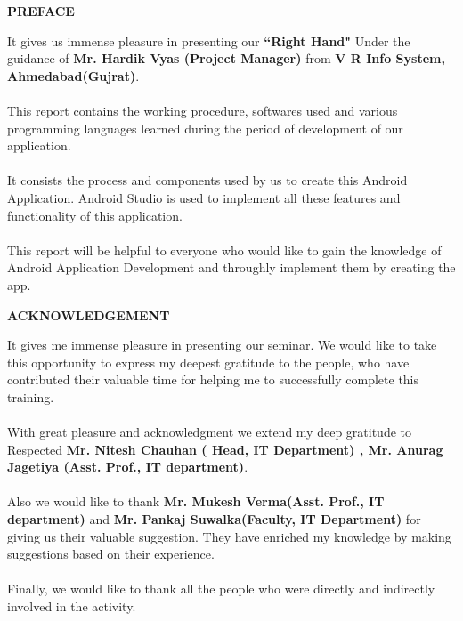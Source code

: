 \documentclass[twoside,a4paper,16pt]{book}
\begin{document}
\newpage
\begin{center}
\huge{\bf PREFACE}
\end{center}
\vspace{1.5cm}
\large It gives us immense pleasure in presenting our {\bf ``Right Hand"}  Under the  guidance of  {\bf Mr. Hardik Vyas (Project Manager)} from {\bf V R Info System, Ahmedabad(Gujrat)}.\\\\
This report contains the working procedure, softwares used and various programming languages learned during the period of development of our application.\\\\
It consists the process and components used by us to create this Android Application. Android Studio is used to implement all these features and functionality of this application.\\\\
This report will be helpful to everyone who would like to gain the knowledge of Android Application Development and throughly implement them by creating the app. 
 \newpage
\begin{center}
\huge{\bf ACKNOWLEDGEMENT} 
\end{center}
\vspace{1.5cm}
It gives me immense pleasure in presenting our seminar. We would like to take this
opportunity to express my deepest gratitude to the people, who have contributed
their valuable time for helping me to successfully complete this training.\\\\
 With great pleasure and acknowledgment we extend my deep gratitude to Respected
 {\bf Mr. Nitesh Chauhan ( Head, IT Department) , Mr. Anurag Jagetiya (Asst. Prof., IT
department)}.\\\\
Also we would like to thank {\bf Mr. Mukesh Verma(Asst. Prof., IT department)} and {\bf Mr. Pankaj Suwalka(Faculty, IT Department)} for giving us their valuable suggestion.
They have enriched my knowledge by making suggestions based on their experience.\\\\
Finally, we would like to thank all the people who were directly and indirectly involved
in the activity.
\newpage
\mainmatter
\tableofcontents
\listoffigures
\contentstyleisdeshed

\newpage
\end{document}
